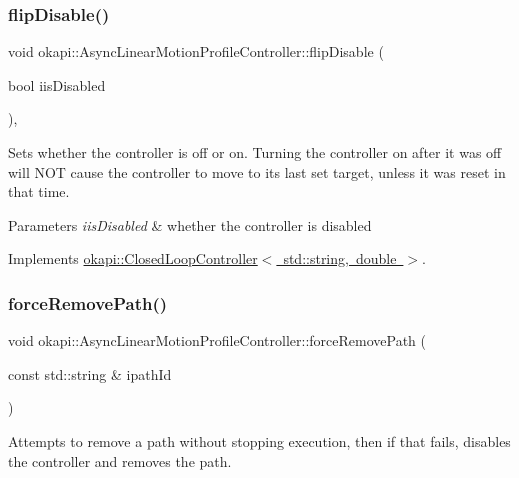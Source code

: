 \subsubsection{\texorpdfstring{flipDisable()}{flipDisable()}\hspace{0.1cm}{\footnotesize\ttfamily [2/2]}}
{\footnotesize\ttfamily void okapi\+::\+Async\+Linear\+Motion\+Profile\+Controller\+::flip\+Disable (\begin{DoxyParamCaption}\item[{bool}]{iis\+Disabled }\end{DoxyParamCaption})\hspace{0.3cm}{\ttfamily [override]}, {\ttfamily [virtual]}}

Sets whether the controller is off or on. Turning the controller on after it was off will N\+OT cause the controller to move to its last set target, unless it was reset in that time.


\begin{DoxyParams}{Parameters}
{\em iis\+Disabled} & whether the controller is disabled \\
\hline
\end{DoxyParams}


Implements \mbox{\hyperlink{classokapi_1_1ClosedLoopController_a768cd1db40ce9cd5c89b20be6e838ccc}{okapi\+::\+Closed\+Loop\+Controller$<$ std\+::string, double $>$}}.

\mbox{\label{classokapi_1_1AsyncLinearMotionProfileController_a59582a155943d96d5f6be9c06cfbf704}} 
\subsubsection{\texorpdfstring{forceRemovePath()}{forceRemovePath()}}
{\footnotesize\ttfamily void okapi\+::\+Async\+Linear\+Motion\+Profile\+Controller\+::force\+Remove\+Path (\begin{DoxyParamCaption}\item[{const std\+::string \&}]{ipath\+Id }\end{DoxyParamCaption})}

Attempts to remove a path without stopping execution, then if that fails, disables the controller and removes the path.


